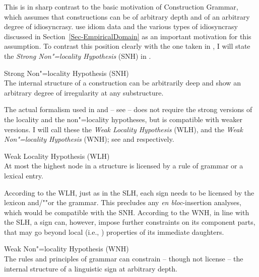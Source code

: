 \documentclass[output=paper,biblatex,babelshorthands,newtxmath,draftmode,colorlinks,citecolor=brown]{langscibook}
\begin{document}
\largerpage[1.3]
This is in sharp contrast to the basic motivation of Construction Grammar\indexcxg, which assumes
that constructions can be of arbitrary depth and of an arbitrary degree of idiosyncrasy.
\citet{FKoC88a} use idiom data and the various types of idiosyncrasy discussed in
Section~\ref{Sec-EmpiricalDomain} as an important motivation for this assumption.  To contrast this
position clearly with the one taken in \citet{ps2}, I will state the \emph{Strong Non"=locality
  Hypothesis} (SNH) in .

\eanoraggedright
Strong Non"=locality Hypothesis (SNH)\label{snh}\\
The internal structure of a construction can be arbitrarily deep and show an arbitrary degree of irregularity at any substructure.
\z

\noindent
The actual formalism used in \citet{ps2} and \citet{King89} -- see
 -- does not require the strong versions of the locality and the
non"=locality hypotheses, but is compatible with weaker versions. I will call these the \emph{Weak
  Locality Hypothesis} (WLH), and the \emph{Weak Non"=locality
  Hypothesis} (WNH); see  and  respectively.

\eanoraggedright
Weak Locality Hypothesis (WLH)\label{wlh}\\
At most the highest node in a structure is licensed by a rule of grammar or a lexical entry.
\z 

\noindent
According to the WLH, just as in the SLH, each sign needs to be licensed by the lexicon and/""or the grammar. 
This precludes any \emph{en bloc}-insertion analyses, which would be compatible with the SNH.
%
According to the WNH, in line with the SLH, a sign can, however, impose further constraints on its
component parts, that may go beyond local (i.e., ) properties of its immediate
daughters. 

\eanoraggedright
Weak Non"=locality Hypothesis (WNH)\label{wnh}\\
The rules and principles of grammar can constrain -- though not license -- the internal structure of a linguistic sign at arbitrary depth.
\z 
\end{document}
